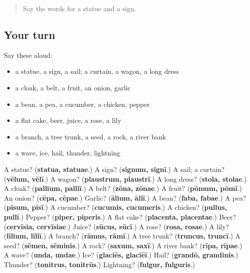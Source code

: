 \label{lesson:LA-R130-second-pass-things-you-use}



\begin{quote}
Say the words for a statue and a sign.
\end{quote}

\subsection*{Your turn}
Say these aloud:

\begin{itemize}
\raggedright
  \item a statue, a sign, a sail; a curtain, a wagon, a long dress
  \item a cloak, a belt, a fruit, an onion, garlic
  \item a bean, a pea, a cucumber, a chicken, pepper
  \item a flat cake, beer, juice, a rose, a lily
  \item a branch, a tree trunk, a seed, a rock, a river bank
  \item a wave, ice, hail, thunder, lightning
\end{itemize}

\begin{tcolorbox}[breakable,colback=teal!4,colframe=teal!35!black,title={Before you move on}]
A statue? (\textbf{statua, statuae}.) A sign? (\textbf{signum, signī}.) A sail; a curtain? (\textbf{vēlum, vēlī}.) A wagon? (\textbf{plaustrum, plaustrī}.) A long dress? (\textbf{stola, stolae}.) A cloak? (\textbf{pallium, palliī}.) A belt? (\textbf{zōna, zōnae}.) A fruit? (\textbf{pōmum, pōmī}.) An onion? (\textbf{cēpa, cēpae}.) Garlic? (\textbf{ālium, āliī}.) A bean? (\textbf{faba, fabae}.) A pea? (\textbf{pīsum, pīsī}.) A cucumber? (\textbf{cucumis, cucumeris}.) A chicken? (\textbf{pullus, pullī}.) Pepper? (\textbf{piper, piperis}.) A flat cake? (\textbf{placenta, placentae}.) Beer? (\textbf{cervīsia, cervīsiae}.) Juice? (\textbf{sūcus, sūcī}.) A rose? (\textbf{rosa, rosae}.) A lily? (\textbf{līlium, līliī}.) A branch? (\textbf{rāmus, rāmī}.) A tree trunk? (\textbf{truncus, truncī}.) A seed? (\textbf{sēmen, sēminis}.) A rock? (\textbf{saxum, saxī}.) A river bank? (\textbf{rīpa, rīpae}.) A wave? (\textbf{unda, undae}.) Ice? (\textbf{glaciēs, glaciēī}.) Hail? (\textbf{grandō, grandinis}.) Thunder? (\textbf{tonitrus, tonitrūs}.) Lightning? (\textbf{fulgur, fulguris}.)
\end{tcolorbox}
